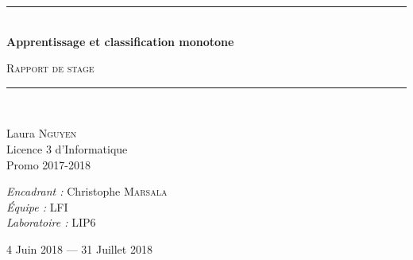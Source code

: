 \documentclass[a4paper]{article}
\newcommand{\HRule}{\rule{\linewidth}{0.5mm}}
\begin{document}
\begin{titlepage}
  \begin{center}


    \vspace{4cm}
    \HRule \\[0.4cm]
    { \huge \bfseries Apprentissage et classification monotone\\[0.4cm] }

      \textsc{\LARGE Rapport de stage}\\[0.4cm]

    \HRule \\[0.4cm]

    \begin{minipage}{0.4\textwidth}
      \begin{flushleft} \large
        Laura \textsc{Nguyen}\\
        Licence 3 d'Informatique\\
        Promo 2017-2018 \\
      \end{flushleft}
    \end{minipage}
    \begin{minipage}{0.5\textwidth}
      \begin{flushright} \large
        \emph{Encadrant :} Christophe \textsc{Marsala}\\
        \emph{Équipe : } \textsc{LFI} \\
        \emph{Laboratoire : } \textsc{LIP6} \\

      \end{flushright}
    \end{minipage}

      \vspace{2cm}

    {\large 4 Juin 2018 — 31 Juillet 2018}

  \end{center}
\end{titlepage}
\end{document}
